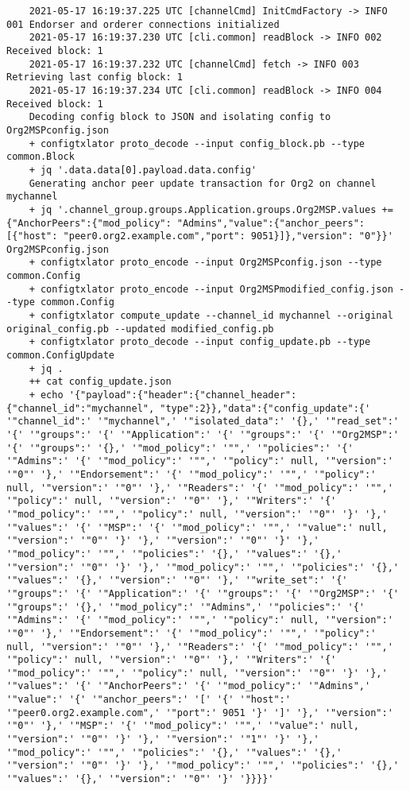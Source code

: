 \begin{lstlisting}
    2021-05-17 16:19:37.225 UTC [channelCmd] InitCmdFactory -> INFO 001 Endorser and orderer connections initialized
    2021-05-17 16:19:37.230 UTC [cli.common] readBlock -> INFO 002 Received block: 1
    2021-05-17 16:19:37.232 UTC [channelCmd] fetch -> INFO 003 Retrieving last config block: 1
    2021-05-17 16:19:37.234 UTC [cli.common] readBlock -> INFO 004 Received block: 1
    Decoding config block to JSON and isolating config to Org2MSPconfig.json
    + configtxlator proto_decode --input config_block.pb --type common.Block
    + jq '.data.data[0].payload.data.config'
    Generating anchor peer update transaction for Org2 on channel mychannel
    + jq '.channel_group.groups.Application.groups.Org2MSP.values += {"AnchorPeers":{"mod_policy": "Admins","value":{"anchor_peers": [{"host": "peer0.org2.example.com","port": 9051}]},"version": "0"}}' Org2MSPconfig.json
    + configtxlator proto_encode --input Org2MSPconfig.json --type common.Config
    + configtxlator proto_encode --input Org2MSPmodified_config.json --type common.Config
    + configtxlator compute_update --channel_id mychannel --original original_config.pb --updated modified_config.pb
    + configtxlator proto_decode --input config_update.pb --type common.ConfigUpdate
    + jq .
    ++ cat config_update.json
    + echo '{"payload":{"header":{"channel_header":{"channel_id":"mychannel", "type":2}},"data":{"config_update":{' '"channel_id":' '"mychannel",' '"isolated_data":' '{},' '"read_set":' '{' '"groups":' '{' '"Application":' '{' '"groups":' '{' '"Org2MSP":' '{' '"groups":' '{},' '"mod_policy":' '"",' '"policies":' '{' '"Admins":' '{' '"mod_policy":' '"",' '"policy":' null, '"version":' '"0"' '},' '"Endorsement":' '{' '"mod_policy":' '"",' '"policy":' null, '"version":' '"0"' '},' '"Readers":' '{' '"mod_policy":' '"",' '"policy":' null, '"version":' '"0"' '},' '"Writers":' '{' '"mod_policy":' '"",' '"policy":' null, '"version":' '"0"' '}' '},' '"values":' '{' '"MSP":' '{' '"mod_policy":' '"",' '"value":' null, '"version":' '"0"' '}' '},' '"version":' '"0"' '}' '},' '"mod_policy":' '"",' '"policies":' '{},' '"values":' '{},' '"version":' '"0"' '}' '},' '"mod_policy":' '"",' '"policies":' '{},' '"values":' '{},' '"version":' '"0"' '},' '"write_set":' '{' '"groups":' '{' '"Application":' '{' '"groups":' '{' '"Org2MSP":' '{' '"groups":' '{},' '"mod_policy":' '"Admins",' '"policies":' '{' '"Admins":' '{' '"mod_policy":' '"",' '"policy":' null, '"version":' '"0"' '},' '"Endorsement":' '{' '"mod_policy":' '"",' '"policy":' null, '"version":' '"0"' '},' '"Readers":' '{' '"mod_policy":' '"",' '"policy":' null, '"version":' '"0"' '},' '"Writers":' '{' '"mod_policy":' '"",' '"policy":' null, '"version":' '"0"' '}' '},' '"values":' '{' '"AnchorPeers":' '{' '"mod_policy":' '"Admins",' '"value":' '{' '"anchor_peers":' '[' '{' '"host":' '"peer0.org2.example.com",' '"port":' 9051 '}' ']' '},' '"version":' '"0"' '},' '"MSP":' '{' '"mod_policy":' '"",' '"value":' null, '"version":' '"0"' '}' '},' '"version":' '"1"' '}' '},' '"mod_policy":' '"",' '"policies":' '{},' '"values":' '{},' '"version":' '"0"' '}' '},' '"mod_policy":' '"",' '"policies":' '{},' '"values":' '{},' '"version":' '"0"' '}' '}}}}'

\end{lstlisting}
